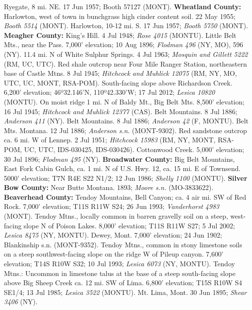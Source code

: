 Ryegate, 8 mi. NE.  17 Jun 1957; Booth 57127 (MONT).
  \textbf{Wheatland County:}
Harlowton, west of town in bunchgrass high cinder content soil. 22 May 1955;
\textit{Booth 5514} (MONT).
Harlowton, 10-12 mi. S. 17 Jun 1957; \textit{Booth 5750} (MONT).
  \textbf{Meagher County:}
King's Hill. 4 Jul 1948; \textit{Rose 4015} (MONTU).
Little Belt Mts., near the Pass. 7,000’ elevation; 10 Aug 1896;
\textit{Flodman 496} (NY, MO), 596 (NY).
11.4 mi. N of White Sulphur Springs. 4 Jul 1963;
\textit{Mosquin and Gillett 5222} (RM, UC, UTC).
Red shale outcrop near Four Mile Ranger Station, northeastern base of Castle
Mtns. 8 Jul 1945; \textit{Hitchcock and Muhlick 12075}
(RM, NY, MO, UTC, UC, MONT, RSA-POM).
South-facing slope above Richardson Creek. 6,200’ elevation;
46º32.146'N, 110º42.330'W; 17 Jul 2012; \textit{Lesica 10820} (MONTU).
On moist ridge 1 mi. N of Baldy Mt., Big Belt Mts. 8,500’ elevation;
16 Jul 1945; \textit{Hitchcock and Muhlick 12377} (CAS).
Belt Mountains. 8 Jul 1886; \textit{Anderson 411} (NY).
Belt Mountains. 8 Jul 1886; \textit{Anderson 42} (F, MONTU).
Belt Mts. Montana.  12 Jul 1886; \textit{Anderson s.n.} (MONT-9302).
Red sandstone outcrop ca. 6 mi. W of Lennep. 2 Jul 1951;
\textit{Hitchcock 15983}
(RM, NY, MONT, RSA-POM, UC, UTC, IDS-030425, IDS-030426).
Cottonwood Creek. 5,000’ elevation; 30 Jul 1896; \textit{Flodman 495} (NY).
  \textbf{Broadwater County:}
Big Belt Mountains, East Fork Cabin Gulch, ca. 1 mi. N of U.S. Hwy. 12, ca. 15
mi. E of Townsend. 5000' elevation; T7N R4E S22 N1/2; 12 Jun 1986;
\textit{Shelly 1100} (MONTU).
  \textbf{Silver Bow County:}
Near Butte Montana. 1893; \textit{Moore s.n.} (MO-3833622).
  \textbf{Beaverhead County:}
Tendoy Mountains, Bell Canyon; ca. 4 air mi. SW of Red Rock.  7,000’ elevation;
T11S R11W S24; 26 Jun 1993; \textit{Vanderhorst 4983} (MONT).
Tendoy Mtns., locally common in barren gravelly soil on a steep, west-facing
slope N of Poison Lakes. 8,000’ elevation; T11S R11W S27; 5 Jul 2002;
\textit{Lesica 8475} (NY, MONTU).
Dewey, Mont. 7,000’ elevation; 24 Jun 1902; Blankinship s.n. (MONT-9352).
Tendoy Mtns., common in stony limestone soils on a steep southwest-facing slope
on the ridge W of Pileup canyon. 7,600’ elevation; T14S R10W S32; 10 Jul 1993;
\textit{Lesica 6073} (NY, MONTU).
Tendoy Mtns.: Uncommon in limestone talus at the base of a steep south-facing
slope above Big Sheep Creek ca. 12 mi. SW of Lima. 6,800' elevation;
T15S R10W S4 SE1/4; 13 Jul 1985; \textit{Lesica 3522} (MONTU).
Mt. Lima, Mont. 30 Jun 1895; \textit{Shear 3406} (NY).
